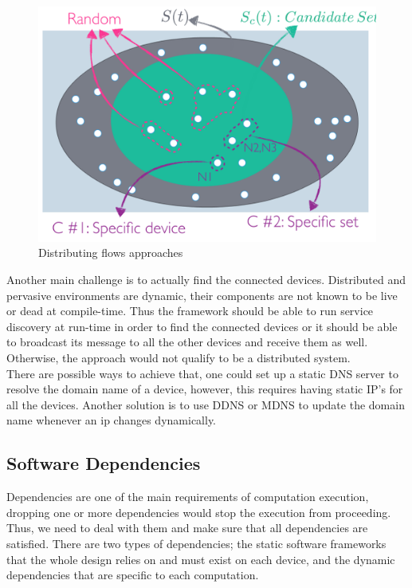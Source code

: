  \begin{figure}[H]
 	\centering
 	\includegraphics[scale=0.45]{images/set.png} 
 	\caption{Distributing flows approaches}
 	\label{fig:distributing-flows}
 \end{figure}

\noindent Another main challenge is to actually find the connected devices. Distributed and pervasive environments are dynamic, their components are not known to be live or dead at compile-time. Thus the framework should be able to run service discovery at run-time in order to find the connected devices or it should be able to broadcast its message to all the other devices and receive them as well. Otherwise, the approach would not qualify to be a distributed system. \\

\noindent There are possible ways to achieve that, one could set up a static DNS server to resolve the domain name of a device, however, this requires having static IP's for all the devices. Another solution is to use DDNS or MDNS to update the domain name whenever an ip changes dynamically.









\subsection{Software Dependencies}

Dependencies are one of the main requirements of computation execution, dropping one or more dependencies would stop the execution from proceeding. Thus, we need to deal with them and make sure that all dependencies are satisfied.  There are two types of dependencies; the static software frameworks that the whole design relies on and must exist on each device, and the dynamic dependencies that are specific to each computation. \\

